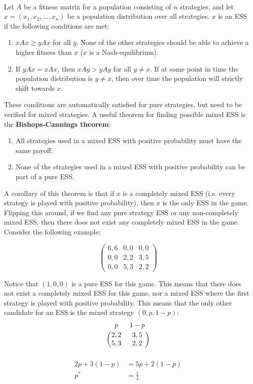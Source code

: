 \documentclass[12pt]{article}
\begin{document}
\noindent
\\
Let $A$ be a fitness matrix for a population consisting of $n$ strategies, and let $x = (x_1, x_2, ... , x_n)$ be a population distribution over all strategies.
$x$ is an ESS if the following conditions are met:

\begin{enumerate}
    \item $xAx \geq yAx$ for all $y$. None of the other strategies should be able to achieve a higher fitness than $x$ ($x$ is a Nash-equilibrium).
    \item If $yAx = xAx$, then $xAy > yAy$ for all $y \neq x$. If at some point in time the population distribution is $y \neq x$, then over time the population will strictly shift towards $x$.
\end{enumerate}

\noindent
These conditions are automatically satisfied for pure strategies, but need to be verified for mixed strategies.
A useful theorem for finding possible mixed ESS is the \textbf{Bishops-Cannings theorem}:

\begin{enumerate}
    \item All strategies used in a mixed ESS with positive probability must have the same payoff.
    \item None of the strategies used in a mixed ESS with positive probability can be part of a pure ESS.
\end{enumerate}

\noindent
A corollary of this theorem is that if $x$ is a completely mixed ESS (i.e. every strategy is played with positive probability), then $x$ is the only ESS in the game.
Flipping this around, if we find any pure strategy ESS or any non-completely mixed ESS, then there does not exist any completely mixed ESS in the game.
Consider the following example:

\newpage
\[ \begin{pmatrix}
    6,6 & 0,0 & 0,0 \\
    0,0 & 2,2 & 3,5 \\
    0,0 & 5,3 & 2,2
\end{pmatrix} \]

\noindent
Notice that $(1, 0, 0)$ is a pure ESS for this game.
This means that there does not exist a completely mixed ESS for this game, nor a mixed ESS where the first strategy is played with positive probability.
This means that the only other candidate for an ESS is the mixed strategy $(0, p, 1 - p)$:
\[ \begin{blockarray}{cc}
    p & 1 - p \\[0.5ex]
    \begin{block}{(cc)}
        2,2 & 3,5 \\
        5,3 & 2,2 \\
    \end{block}
\end{blockarray} \] \vspace{-1cm}
\begin{align*}
    2p + 3(1 - p) &= 5p + 2(1 - p) \\
    p^* &= \frac{1}{4}
\end{align*}
\end{document}
